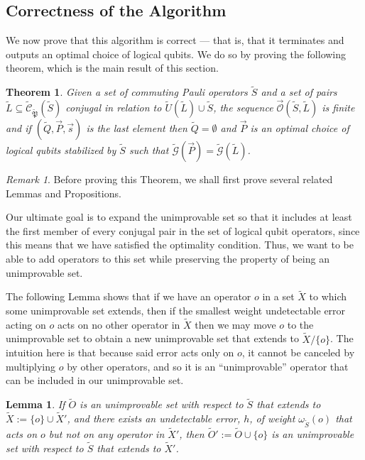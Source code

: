 \documentclass[12pt]{amsbook}
\theoremstyle{plain}
\newtheorem{theorem}{Theorem}
\newtheorem{lemma}{Lemma}
\theoremstyle{definition}
\theoremstyle{remark}
\newtheorem{remark}{Remark}
\newcommand{\lst}{\vec}
\newcommand{\set}{\tilde}
\newcommand{\genfun}{\tilde{\mathcal{G}}}
\newcommand{\pauligroup}{{\set{\mathfrak{P}}}}
\newcommand{\centralizer}{\set{\mathcal{C}}}
\newcommand{\optimizer}{\lst{\mathcal{O}}}
\newcommand{\om}{\omega}
\begin{document}
\subsection{Correctness of the Algorithm}

We now prove that this algorithm is correct --- that is, that it terminates and outputs an optimal choice of logical qubits.  We do so by proving the following theorem, which is the main result of this section.

\begin{theorem}
\label{theorem:algorithm is correct}
Given a set of commuting Pauli operators $\set S$ and a set of pairs $\set L\subseteq\centralizer_\pauligroup(\set S)$ conjugal in relation to $\set U(\set L)\cup\set S$, the sequence $\optimizer(\set S,\set L)$ is finite and if $(\set Q,\lst P,\lst s)$ is the last element then $\set Q=\emptyset$ and $\lst P$ is an optimal choice of logical qubits stabilized by $\set S$ such that $\genfun(\lst P)=\genfun(\set L)$.
\end{theorem}
\begin{remark}
Before proving this Theorem, we shall first prove several related Lemmas and Propositions.

Our ultimate goal is to expand the unimprovable set so that it includes at least the first member of every conjugal pair in the set of logical qubit operators, since this means that we have satisfied the optimality condition.  Thus, we want to be able to add operators to this set while preserving the property of being an unimprovable set.

The following Lemma shows that if we have an operator $o$ in a set $\set X$ to which some unimprovable set extends, then if the smallest weight undetectable error acting on $o$ acts on no other operator in $\set X$ then we may move $o$ to the unimprovable set to obtain a new unimprovable set that extends to $\set X\slash \{o\}$.  The intuition here is that because said error acts only on $o$, it cannot be canceled by multiplying $o$ by other operators, and so it is an ``unimprovable'' operator that can be included in our unimprovable set.
\end{remark}

\begin{lemma}
\label{lemma:move-it-over}
If $\set O$ is an unimprovable set with respect to $\set S$ that extends to $\set X:=\{o\}\cup\set X'$, and there exists an undetectable error, $h$, of weight $\om_{\set S}(o)$ that acts on $o$ but not on any operator in $\set X'$, then $\set O':=\set O\cup\{o\}$ is an unimprovable set with respect to $\set S$ that extends to $\set X'$.
\end{lemma}
\end{document}
